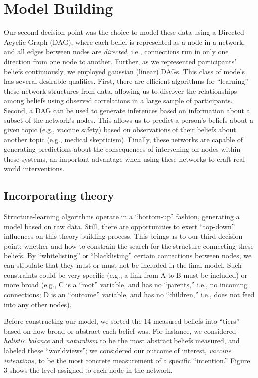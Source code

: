 \documentclass[10pt, letterpaper]{article}
\begin{document}
\section{Model Building}\label{model-building}

Our second decision point was the choice to model these data using a
Directed Acyclic Graph (DAG), where each belief is represented as a node
in a network, and all edges between nodes are \emph{directed}, i.e.,
connections run in only one direction from one node to another. Further,
as we represented participants' beliefs continuously, we employed
gaussian (linear) DAGs. This class of models has several desirable
qualities. First, there are efficient algorithms for ``learning'' these
network structures from data, allowing us to discover the relationships
among beliefs using observed correlations in a large sample of
participants. Second, a DAG can be used to generate inferences based on
information about a subset of the network's nodes. This allows us to
predict a person's beliefs about a given topic (e.g., vaccine safety)
based on observations of their beliefs about another topic (e.g.,
medical skepticism). Finally, these networks are capable of generating
predictions about the consequences of intervening on nodes within these
systems, an important advantage when using these networks to craft
real-world interventions.

\subsection{Incorporating theory}\label{incorporating-theory}

Structure-learning algorithms operate in a ``bottom-up'' fashion,
generating a model based on raw data. Still, there are opportunities to
exert ``top-down'' influences on this theory-building process. This
brings us to our third decision point: whether and how to constrain the
search for the structure connecting these beliefs. By ``whitelisting''
or ``blacklisting'' certain connections between nodes, we can stipulate
that they must or must not be included in the final model. Such
constraints could be very specific (e.g., a link from A to B must be
included) or more broad (e.g., C is a ``root'' variable, and has no
``parents,'' i.e., no incoming connections; D is an ``outcome''
variable, and has no ``children,'' i.e., does not feed into any other
nodes).

Before constructing our model, we sorted the 14 measured beliefs into
``tiers'' based on how broad or abstract each belief was. For instance,
we considered \emph{holistic balance} and \emph{naturalism} to be the
most abstract beliefs measured, and labeled these ``worldviews''; we
considered our outcome of interest, \emph{vaccine intentions}, to be the
most concrete measurement of a specific ``intention.'' Figure 3 shows
the level assigned to each node in the network.
\end{document}
